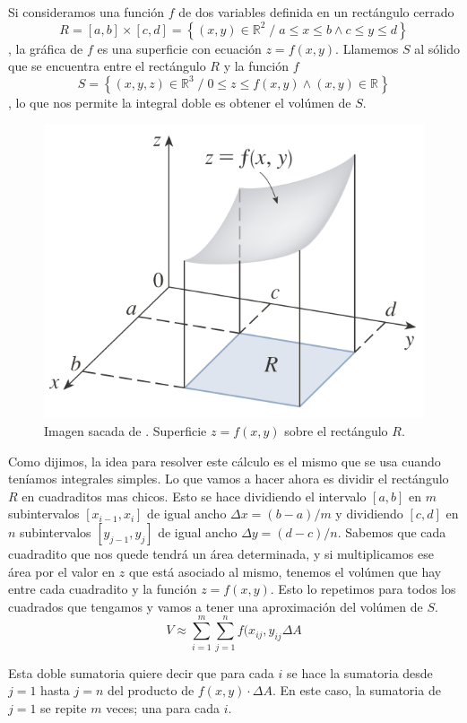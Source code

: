 \documentclass[12pt]{article}
\begin{document}
Si consideramos una función $ f $ de dos variables definida en un rectángulo cerrado 
\[
  R = \left[a,b\right]\times \left[c,d\right] = \left\{(x,y) \in \mathbb{R}^{2} \;/\; a\leq x\leq b  \land c\leq y\leq d\right\}
\]
, la gráfica de $ f $ es una superficie con ecuación $ z=f(x,y) $. Llamemos $ S $ al sólido que se encuentra entre el rectángulo $ R $ y la función $ f $
\[
  S=\left\{(x,y,z) \in \mathbb{R}^{3} \;/\; 0\leq z\leq f(x,y) \land (x,y) \in \mathbb{R}^{}\right\}
\]
, lo que nos permite la integral doble es obtener el volúmen de $ S $.

\begin{figure}[H]
  \centering
  \includegraphics[width=0.5\linewidth]{imagenes/vol-integrado-1.png}
  \caption{Imagen sacada de \parencite{stewart2}. Superficie $ z=f(x,y) $ sobre el rectángulo $ R $.}
  \label{fig:integrales-1}
\end{figure}

Como dijimos, la idea para resolver este cálculo es el mismo que se usa cuando teníamos integrales simples. Lo que vamos a hacer ahora es dividir el rectángulo $ R $ en cuadraditos mas chicos. Esto se hace dividiendo el intervalo $ \left[a,b\right] $ en $ m $ subintervalos $ \left[x_{i-1},x_{i}\right] $ de igual ancho $ \Delta x=(b-a)/m $ y dividiendo $ \left[c,d\right] $ en $ n $ subintervalos $ \left[y_{j-1},y_{j}\right] $ de igual ancho $ \Delta y=(d-c)/n $. Sabemos que cada cuadradito que nos quede tendrá un área determinada, y si multiplicamos ese área por el valor en $ z $ que está asociado al mismo, tenemos el volúmen que hay entre cada cuadradito y la función $ z=f(x,y) $. Esto lo repetimos para todos los cuadrados que tengamos y vamos a tener una aproximación del volúmen de $ S $. 
\[
  V\approx \sum_{i=1}^{m} \sum_{j=1}^{n} f(x_{ij},y_{ij}\Delta A  
\]

Esta doble sumatoria quiere decir que para cada $ i $ se hace la sumatoria desde $ j=1 $ hasta $ j=n $ del producto de $ f(x,y)\cdot \Delta A $. En este caso, la sumatoria de $ j=1 $ se repite $ m $ veces; una para cada $ i $.
\end{document}
